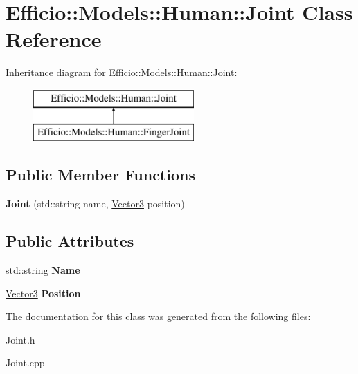 \hypertarget{class_efficio_1_1_models_1_1_human_1_1_joint}{}\section{Efficio\+:\+:Models\+:\+:Human\+:\+:Joint Class Reference}
\label{class_efficio_1_1_models_1_1_human_1_1_joint}
Inheritance diagram for Efficio\+:\+:Models\+:\+:Human\+:\+:Joint\+:\begin{figure}[H]
\begin{center}
\leavevmode
\includegraphics[height=2.000000cm]{class_efficio_1_1_models_1_1_human_1_1_joint}
\end{center}
\end{figure}
\subsection*{Public Member Functions}
\begin{DoxyCompactItemize}
\item 
{\bfseries Joint} (std\+::string name, \hyperlink{class_efficio_1_1_vector3}{Vector3} position)\hypertarget{class_efficio_1_1_models_1_1_human_1_1_joint_a65de67f05b6c9fc7585c81af487abc73}{}\label{class_efficio_1_1_models_1_1_human_1_1_joint_a65de67f05b6c9fc7585c81af487abc73}

\end{DoxyCompactItemize}
\subsection*{Public Attributes}
\begin{DoxyCompactItemize}
\item 
std\+::string {\bfseries Name}\hypertarget{class_efficio_1_1_models_1_1_human_1_1_joint_a24a3cc18594979bee8b9606820618553}{}\label{class_efficio_1_1_models_1_1_human_1_1_joint_a24a3cc18594979bee8b9606820618553}

\item 
\hyperlink{class_efficio_1_1_vector3}{Vector3} {\bfseries Position}\hypertarget{class_efficio_1_1_models_1_1_human_1_1_joint_a7d09e8e2be099d5400ef393ccc281ea0}{}\label{class_efficio_1_1_models_1_1_human_1_1_joint_a7d09e8e2be099d5400ef393ccc281ea0}

\end{DoxyCompactItemize}


The documentation for this class was generated from the following files\+:\begin{DoxyCompactItemize}
\item 
Joint.\+h\item 
Joint.\+cpp\end{DoxyCompactItemize}

